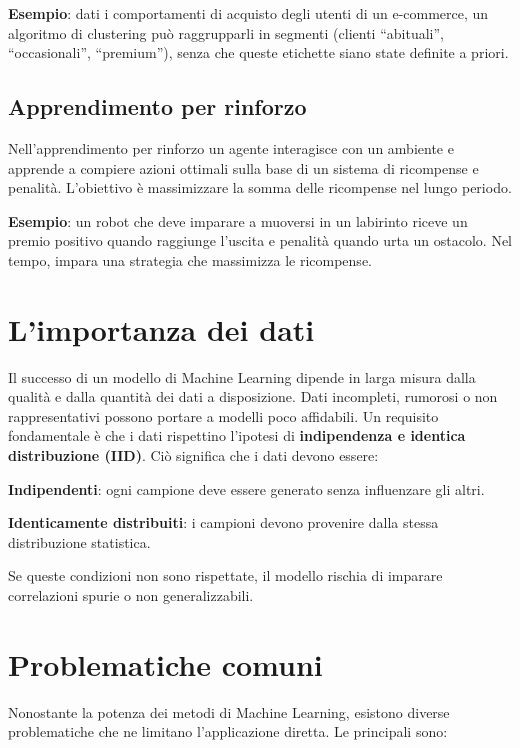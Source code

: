 \textbf{Esempio}: dati i comportamenti di acquisto degli utenti di un e-commerce, un algoritmo di clustering può raggrupparli in segmenti (clienti “abituali”, “occasionali”, “premium”), senza che queste etichette siano state definite a priori.


\subsection{Apprendimento per rinforzo}
Nell’apprendimento per rinforzo un agente interagisce con un ambiente e apprende a compiere azioni ottimali sulla base di un sistema di ricompense e penalità. 
L’obiettivo è massimizzare la somma delle ricompense nel lungo periodo.

\textbf{Esempio}: un robot che deve imparare a muoversi in un labirinto riceve un premio positivo quando raggiunge l’uscita e penalità quando urta un ostacolo. Nel tempo, impara una strategia che massimizza le ricompense.


\section{L’importanza dei dati}

Il successo di un modello di Machine Learning dipende in larga misura dalla qualità e dalla quantità dei dati a disposizione. Dati incompleti, rumorosi o non rappresentativi possono portare a modelli poco affidabili.
Un requisito fondamentale è che i dati rispettino l’ipotesi di \textbf{indipendenza e identica distribuzione (IID)}. Ciò significa che i dati devono essere:
\begin{compactitemize}
    \item \textbf{Indipendenti}: ogni campione deve essere generato senza influenzare gli altri.
    \item \textbf{Identicamente distribuiti}: i campioni devono provenire dalla stessa distribuzione statistica.
\end{compactitemize}

Se queste condizioni non sono rispettate, il modello rischia di imparare correlazioni spurie o non generalizzabili. 


\section{Problematiche comuni}
Nonostante la potenza dei metodi di Machine Learning, esistono diverse problematiche che ne limitano l’applicazione diretta. Le principali sono:


